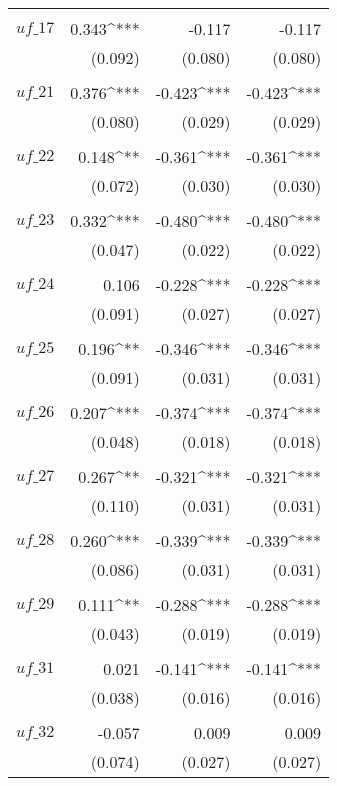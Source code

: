 \begin{apendicesenv}
\begin{footnotesize}
\begin{longtable}{@{\extracolsep{5pt}}lD{.}{.}{-3} D{.}{.}{-3} D{.}{.}{-3} }
	  & & & \\
	 $uf\_17$ & 0.343^{***} & -0.117 & -0.117 \\
	  & (0.092) & (0.080) & (0.080) \\
	  & & & \\
	 $uf\_21$ & 0.376^{***} & -0.423^{***} & -0.423^{***} \\ 
	  & (0.080) & (0.029) & (0.029) \\
	  & & & \\
	 $uf\_22$ & 0.148^{**} & -0.361^{***} & -0.361^{***} \\
	  & (0.072) & (0.030) & (0.030) \\
	  & & & \\
	 $uf\_23$ & 0.332^{***} & -0.480^{***} & -0.480^{***} \\
	  & (0.047) & (0.022) & (0.022) \\ 
	  & & & \\
	 $uf\_24$ & 0.106 & -0.228^{***} & -0.228^{***} \\
	  & (0.091) & (0.027) & (0.027) \\
	  & & & \\
	 $uf\_25$ & 0.196^{**} & -0.346^{***} & -0.346^{***} \\
	  & (0.091) & (0.031) & (0.031) \\
	  & & & \\
	 $uf\_26$ & 0.207^{***} & -0.374^{***} & -0.374^{***} \\ 
	  & (0.048) & (0.018) & (0.018) \\
	  & & & \\
	 $uf\_27$ & 0.267^{**} & -0.321^{***} & -0.321^{***} \\
	  & (0.110) & (0.031) & (0.031) \\
	  & & & \\
	 $uf\_28$ & 0.260^{***} & -0.339^{***} & -0.339^{***} \\ 
	  & (0.086) & (0.031) & (0.031) \\
	  & & & \\
	 $uf\_29$ & 0.111^{**} & -0.288^{***} & -0.288^{***} \\
	  & (0.043) & (0.019) & (0.019) \\
	  & & & \\
	 $uf\_31$ & 0.021 & -0.141^{***} & -0.141^{***} \\ 
	  & (0.038) & (0.016) & (0.016) \\
	  & & & \\
	 $uf\_32$ & -0.057 & 0.009 & 0.009 \\ 
	  & (0.074) & (0.027) & (0.027) \\

\end{longtable}
\end{footnotesize}
\end{apendicesenv}
